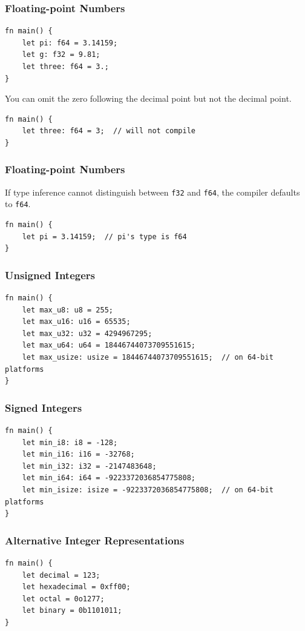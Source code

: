 \begin{frame}[fragile]
    \frametitle{Floating-point Numbers}
    \begin{verbatim}
fn main() {
    let pi: f64 = 3.14159;
    let g: f32 = 9.81;
    let three: f64 = 3.;
}
    \end{verbatim}
    \pause
    \vfill
    You can omit the zero following the decimal point but not the decimal point.
    \pause
    \vfill
    \begin{verbatim}
fn main() {
    let three: f64 = 3;  // will not compile
}
    \end{verbatim}
\end{frame}

\begin{frame}[fragile]
    \frametitle{Floating-point Numbers}
    If type inference cannot distinguish between \texttt{f32} and \texttt{f64}, the compiler defaults to \texttt{f64}.
    \pause
    \vfill
    \begin{verbatim}
fn main() {
    let pi = 3.14159;  // pi's type is f64
}
    \end{verbatim}
\end{frame}

\begin{frame}[fragile]
    \frametitle{Unsigned Integers}
    \begin{verbatim}
fn main() {
    let max_u8: u8 = 255;
    let max_u16: u16 = 65535;
    let max_u32: u32 = 4294967295;
    let max_u64: u64 = 18446744073709551615;
    let max_usize: usize = 18446744073709551615;  // on 64-bit platforms
}
    \end{verbatim}
\end{frame}

\begin{frame}[fragile]
    \frametitle{Signed Integers}
    \begin{verbatim}
fn main() {
    let min_i8: i8 = -128;
    let min_i16: i16 = -32768;
    let min_i32: i32 = -2147483648;
    let min_i64: i64 = -9223372036854775808;
    let min_isize: isize = -9223372036854775808;  // on 64-bit platforms
}
    \end{verbatim}
\end{frame}

\begin{frame}[fragile]
    \frametitle{Alternative Integer Representations}
    \begin{verbatim}
fn main() {
    let decimal = 123;
    let hexadecimal = 0xff00;
    let octal = 0o1277;
    let binary = 0b1101011;
}
    \end{verbatim}
\end{frame}

